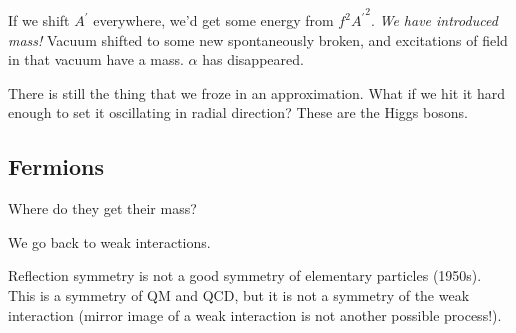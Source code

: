 \documentclass[]{article}
\begin{document}
If we shift $A^\prime$ everywhere, we'd get some energy from $f^2 {A^\prime}^2$. \emph{We have introduced mass!} Vacuum shifted to some new spontaneously broken, and excitations of field in that vacuum have a mass. $\alpha$ has disappeared.

There is still the thing that we froze in an approximation. What if we hit it hard enough to set it oscillating in radial direction? These are the Higgs bosons.
 
\subsection{Fermions}

Where do they get their mass?

We go back to weak interactions.

Reflection symmetry is not a good symmetry of elementary particles (1950s). This is a symmetry of QM and QCD, but it is not a symmetry of the weak interaction (mirror image of a weak interaction is not another possible process!). 
\end{document}
